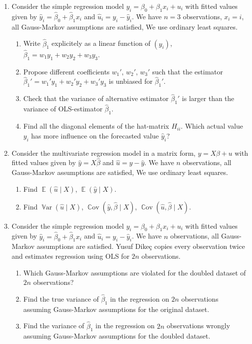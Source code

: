 \documentclass[12pt]{article}
\DeclareMathOperator{\Cov}{\mathbb{C}ov}
\DeclareMathOperator{\Var}{\mathbb{V}ar}
\DeclareMathOperator{\E}{\mathbb{E}}
\newcommand{\hb}{\hat\beta}
\begin{document}
\begin{enumerate}
\item Consider the simple regression model $y_i = \beta_0 + \beta_1 x_i + u_i$ with fitted values given by $\hat y_i = \hb_0 + \hb_1 x_i$ and $\hat u_i = y_i - \hat y_i$.
We have $n = 3$ observations, $x_i = i$, all Gauss-Markov assumptions are satisfied,
We use ordinary least squares.
\begin{enumerate}
    \item Write $\hb_1$ explicitely as a linear function of $(y_i)$, $\hb_1 = w_1 y_1 + w_2 y_2 + w_3 y_3$.
    \item Propose different coefficients $w_1'$, $w_2'$, $w_3'$ such that the estimator $\hb_1' =  w_1' y_1 + w_2' y_2 + w_3' y_3$ is unbiased for $\hb_1'$.
    \item Check that the variance of alternative estimator $\hb_1'$ is larger than the variance of OLS-estimator $\hb_1$.
    \item Find all the diagonal elements of the hat-matrix $H_{ii}$. 
    Which actual value $y_i$ has more influence on the forecasted value $\hat y_i$?
\end{enumerate}


\item Consider the multivariate regression model in a matrix form, $y = X\beta + u$ with fitted values given by $\hat y = X\hb$ and $\hat u = y - \hat y$.
We have $n$ observations, all Gauss-Markov assumptions are satisfied,
We use ordinary least squares.

\begin{enumerate}
    \item Find $\E(\hat u \mid X)$, $\E(\hat y \mid X)$.
    \item Find $\Var(\hat u \mid X)$, $\Cov(\hat y, \hb \mid X)$, $\Cov(\hat u, \hb \mid X)$.
\end{enumerate}

\item Consider the simple regression model $y_i = \beta_0 + \beta_1 x_i + u_i$ with fitted values given by $\hat y_i = \hb_0 + \hb_1 x_i$ and $\hat u_i = y_i - \hat y_i$.
We have $n$ observations, all Gauss-Markov assumptions are satisfied.
Yusuf Dikeç copies every observation twice and estimates regression using OLS for $2n$ observations. 

\begin{enumerate}
    \item Which Gauss-Markov assumptions are violated for the doubled dataset of $2n$ observations?
    \item Find the true variance of $\hb_1$ in the regression on $2n$ observations assuming Gauss-Markov assumptions for the original dataset.
    \item Find the variance of $\hb_1$ in the regression on $2n$ observations wrongly assuming Gauss-Markov assumptions for the doubled dataset.
\end{enumerate}

\end{enumerate}
\end{document}
